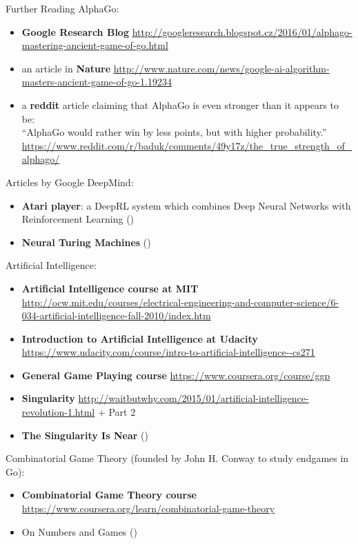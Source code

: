 \documentclass{beamer}
\begin{document}
  \begin{frame}[allowframebreaks]{Further Reading}
    \tiny
    AlphaGo:
    \begin{itemize}
      \item \textbf{Google Research Blog} \url{http://googleresearch.blogspot.cz/2016/01/alphago-mastering-ancient-game-of-go.html}
      \item an article in \textbf{Nature} \url{http://www.nature.com/news/google-ai-algorithm-masters-ancient-game-of-go-1.19234}
      \item a \textbf{reddit} article claiming that AlphaGo is even stronger than it appears to be: \\
        ``AlphaGo would rather win by less points, but with higher probability.'' \\
        \url{https://www.reddit.com/r/baduk/comments/49y17z/the_true_strength_of_alphago/}
    \end{itemize}

    Articles by Google DeepMind:
    \begin{itemize}
      \item \textbf{Atari player}: a DeepRL system which combines Deep Neural Networks with Reinforcement Learning (\cite{Mnih2015human})
      \item \textbf{Neural Turing Machines} (\cite{Graves2014neural})
    \end{itemize}

    Artificial Intelligence:
    \begin{itemize}
      \item \textbf{Artificial Intelligence course at MIT} \url{http://ocw.mit.edu/courses/electrical-engineering-and-computer-science/6-034-artificial-intelligence-fall-2010/index.htm}
      \item \textbf{Introduction to Artificial Intelligence at Udacity} \url{https://www.udacity.com/course/intro-to-artificial-intelligence--cs271}
      \item \textbf{General Game Playing course} \url{https://www.coursera.org/course/ggp}
      \item \textbf{Singularity} \url{http://waitbutwhy.com/2015/01/artificial-intelligence-revolution-1.html} + Part 2
      \item \textbf{The Singularity Is Near} (\cite{Kurzweil2005singularity})
    \end{itemize}

    Combinatorial Game Theory (founded by John H. Conway to study endgames in Go):
    \begin{itemize}
      \item \textbf{Combinatorial Game Theory course} \url{https://www.coursera.org/learn/combinatorial-game-theory}
      \item On Numbers and Games (\cite{Conway1976number})
    \end{itemize}


\end{frame}
\end{document}
